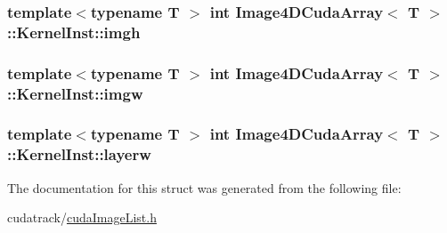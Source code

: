 \subsubsection[{\texorpdfstring{imgh}{imgh}}]{\setlength{\rightskip}{0pt plus 5cm}template$<$typename T $>$ int {\bf Image4\+D\+Cuda\+Array}$<$ T $>$\+::Kernel\+Inst\+::imgh}\hypertarget{struct_image4_d_cuda_array_1_1_kernel_inst_a45e62046843a94ac7834849847cafbdc}{}\label{struct_image4_d_cuda_array_1_1_kernel_inst_a45e62046843a94ac7834849847cafbdc}
\subsubsection[{\texorpdfstring{imgw}{imgw}}]{\setlength{\rightskip}{0pt plus 5cm}template$<$typename T $>$ int {\bf Image4\+D\+Cuda\+Array}$<$ T $>$\+::Kernel\+Inst\+::imgw}\hypertarget{struct_image4_d_cuda_array_1_1_kernel_inst_aada9791bd402e67c6d9a2dd2e5fa28b5}{}\label{struct_image4_d_cuda_array_1_1_kernel_inst_aada9791bd402e67c6d9a2dd2e5fa28b5}
\subsubsection[{\texorpdfstring{layerw}{layerw}}]{\setlength{\rightskip}{0pt plus 5cm}template$<$typename T $>$ int {\bf Image4\+D\+Cuda\+Array}$<$ T $>$\+::Kernel\+Inst\+::layerw}\hypertarget{struct_image4_d_cuda_array_1_1_kernel_inst_aa1264147741eabee6f8fae0b22cbcf28}{}\label{struct_image4_d_cuda_array_1_1_kernel_inst_aa1264147741eabee6f8fae0b22cbcf28}


The documentation for this struct was generated from the following file\+:\begin{DoxyCompactItemize}
\item 
cudatrack/\hyperlink{cuda_image_list_8h}{cuda\+Image\+List.\+h}\end{DoxyCompactItemize}
